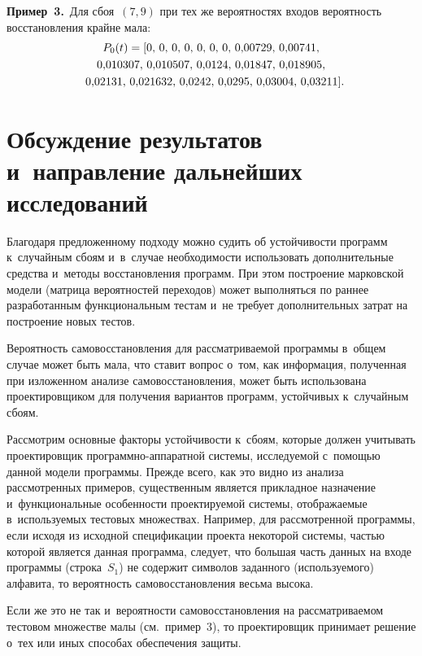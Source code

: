 \begin{multicols}{2}
\noindent
\textbf{Пример~3.}\ Для сбоя~$(7,9)$ при тех же вероятностях входов 
вероятность восстановления крайне мала:
\begin{multline*}
P_0(t) = [0,\, 0,\, 0,\, 0,\, 0,\, 0,\, 0,\, 0{,}00729,\, 0{,}00741,\\
0{,}010307,\, 0{,}010507,\, 0{,}0124,\,  0{,}01847,\, 0{,}018905,\\
0{,}02131,\, 0{,}021632,\, 0{,}0242,\, 0{,}0295,\, 0{,}03004,\, 
0{,}03211].\hspace*{-6.59938pt}
\end{multline*}
     
\section{Обсуждение результатов и~направление дальнейших 
исследований}

     Благодаря предложенному подходу можно судить об устойчивости 
программ к~случайным сбоям и~в~случае необходимости использовать 
дополнительные средства и~методы восстановления программ. При этом 
построение марковской модели (матрица вероятностей переходов) может 
выполняться по раннее разработанным функциональным тестам и~не требует 
дополнительных затрат на построение новых тестов. 
     
    Вероятность самовосстановления для рас\-смат\-ри\-ва\-емой программы 
в~общем случае может быть мала, что ставит вопрос о~том, как информация, 
полученная при изложенном анализе самовосстановления, может быть 
использована проектировщиком для получения вариантов программ, 
устойчивых к~случайным сбоям.

     Рассмотрим основные факторы устойчивости к~сбоям, которые должен 
учитывать проектировщик про\-грам\-мно-ап\-па\-рат\-ной системы, ис\-сле\-ду\-емой 
с~по\-мощью данной модели программы. 
%
Преж\-де всего, как это видно из 
анализа рас\-смотренных примеров, существенным является прикладное 
назначение и~функциональные особенности проектируемой системы, 
отображаемые в~используемых тестовых множествах. Например, для 
рассмотренной программы, если исходя из исходной спецификации проекта 
некоторой системы, частью которой является данная программа, следует, что 
большая часть данных на входе программы (строка~$S_1$) не содержит 
символов заданного (используемого) алфавита, то вероятность 
самовосстановления весьма высока. 

Если же это не так и~вероятности 
самовосстановления на рассматриваемом тестовом множестве малы 
(см.\ пример~3), то проектировщик принимает решение о~тех или иных способах 
обеспечения защиты. 


\end{multicols}
